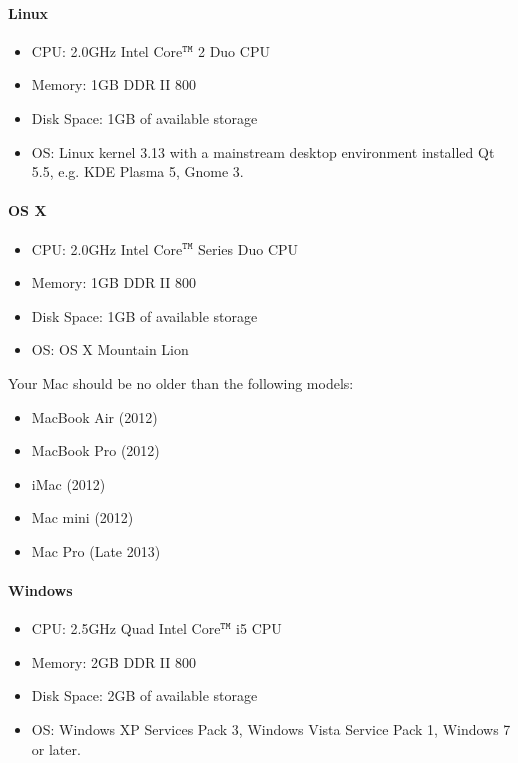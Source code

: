 \documentclass[11pt,a4paper]{article}
\begin{document}
                \paragraph{Linux}
                    \begin{itemize}
                        \item CPU: 2.0GHz Intel{\textregistered} Core$^{\texttt{TM}}$ 2 Duo CPU
                        \item Memory: 1GB DDR II 800
                        \item Disk Space: 1GB of available storage
                        \item OS: Linux kernel 3.13 with a mainstream desktop environment installed Qt 5.5, e.g. KDE Plasma 5, Gnome 3.
                    \end{itemize}
                \paragraph{OS X}
                    \begin{itemize}
                        \item CPU: 2.0GHz Intel{\textregistered} Core$^{\texttt{TM}}$ Series Duo CPU
                        \item Memory: 1GB DDR II 800
                        \item Disk Space: 1GB of available storage
                        \item OS: OS X Mountain Lion
                    \end{itemize}
                    Your Mac should be no older than the following models:
                    \begin{itemize}
                        \item MacBook Air (2012)
                        \item MacBook Pro (2012)
                        \item iMac (2012)
                        \item Mac mini (2012)
                        \item Mac Pro (Late 2013)
                    \end{itemize}
                \paragraph{Windows}
                    \begin{itemize}
                        \item CPU: 2.5GHz Quad Intel{\textregistered} Core$^{\texttt{TM}}$ i5 CPU
                        \item Memory: 2GB DDR II 800
                        \item Disk Space: 2GB of available storage
                        \item OS: Windows XP Services Pack 3, Windows Vista Service Pack 1, Windows 7 or later.
                    \end{itemize}
\end{document}
